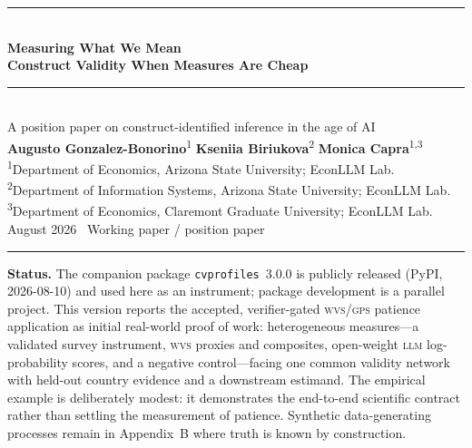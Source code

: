 \documentclass[10pt,letterpaper]{article}
\newcommand{\SCA}{\textsc{sca}}
\newcommand{\LLM}{\textsc{llm}}
\newcommand{\DPO}{\textsc{dpo}}
\newcommand{\GPS}{\textsc{gps}}
\newcommand{\WVS}{\textsc{wvs}}
\newcommand{\cvp}{\texttt{cvprofiles}}
\newcommand{\M}{\ensuremath{\mathcal{M}}}
\newcommand{\E}{\mathbb{E}}
\newcommand{\Rset}{\mathcal{R}}
\newcommand{\Bset}{\mathcal{B}}
\begin{document}
\thispagestyle{empty}
\begin{center}
\vspace*{1.1cm}
{\color{econblue}\rule{\textwidth}{1.15pt}}\\[0.45em]
{\LARGE\bfseries\color{econblue} Measuring What We Mean}\\[0.16em]
{\LARGE\bfseries\color{econblue} Construct Validity When Measures Are Cheap}\\[0.45em]
{\color{econblue}\rule{\textwidth}{0.55pt}}\\[0.75em]
{\large A position paper on construct-identified inference in the age of AI}\\[0.95em]
{\large\textbf{Augusto Gonzalez-Bonorino}\textsuperscript{1}\quad
\textbf{Kseniia Biriukova}\textsuperscript{2}\quad
\textbf{Monica Capra}\textsuperscript{1,3}}\\[0.5em]
{\small\textsuperscript{1}Department of Economics, Arizona State University; EconLLM Lab.\\
\textsuperscript{2}Department of Information Systems, Arizona State University; EconLLM Lab.\\
\textsuperscript{3}Department of Economics, Claremont Graduate University; EconLLM Lab.}\\[0.75em]
{\normalsize August 2026 \textperiodcentered\ Working paper / position paper}\\[0.35em]
{\color{econblue}\rule{0.28\textwidth}{0.35pt}}
\end{center}

\vspace{0.6em}


\noindent\colorbox{mist}{\parbox{0.965\textwidth}{\small\vspace{0.3em}
\textbf{Status.}
The companion package \cvp{}~3.0.0 is publicly released (PyPI, 2026-08-10) and used here as an instrument; package development is a parallel project.
This version reports the accepted, verifier-gated \WVS/\GPS{} patience application as initial real-world proof of work: heterogeneous measures---a validated survey instrument, \WVS{} proxies and composites, open-weight \LLM{} log-probability scores, and a negative control---facing one common validity network with held-out country evidence and a downstream estimand.
The empirical example is deliberately modest: it demonstrates the end-to-end scientific contract rather than settling the measurement of patience.
Synthetic data-generating processes remain in Appendix~B where truth is known by construction.
\vspace{0.3em}}}
\end{document}
